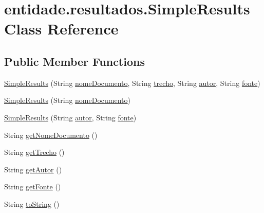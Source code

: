 \hypertarget{classentidade_1_1resultados_1_1SimpleResults}{}\section{entidade.\+resultados.\+Simple\+Results Class Reference}
\label{classentidade_1_1resultados_1_1SimpleResults}
\subsection*{Public Member Functions}
\begin{DoxyCompactItemize}
\item 
\hyperlink{classentidade_1_1resultados_1_1SimpleResults_a36411d7a5b487a8cb8d49e5dc13cccc3}{Simple\+Results} (String \hyperlink{classentidade_1_1resultados_1_1SimpleResults_a9dec340294219ec16a2e2b42e68ba350}{nome\+Documento}, String \hyperlink{classentidade_1_1resultados_1_1SimpleResults_a94e8f77e73a35a3a544f30de1d4fa5b6}{trecho}, String \hyperlink{classentidade_1_1resultados_1_1SimpleResults_afc17e94212f3953a05f63f9de5d4c345}{autor}, String \hyperlink{classentidade_1_1resultados_1_1SimpleResults_a2442d65af6ba817cd26d5bd41ef8c65c}{fonte})
\item 
\hyperlink{classentidade_1_1resultados_1_1SimpleResults_a4096968b8553b2b79984846a6f51603d}{Simple\+Results} (String \hyperlink{classentidade_1_1resultados_1_1SimpleResults_a9dec340294219ec16a2e2b42e68ba350}{nome\+Documento})
\item 
\hyperlink{classentidade_1_1resultados_1_1SimpleResults_a812be57a6cbdee87ce754241eeae9bc0}{Simple\+Results} (String \hyperlink{classentidade_1_1resultados_1_1SimpleResults_afc17e94212f3953a05f63f9de5d4c345}{autor}, String \hyperlink{classentidade_1_1resultados_1_1SimpleResults_a2442d65af6ba817cd26d5bd41ef8c65c}{fonte})
\item 
String \hyperlink{classentidade_1_1resultados_1_1SimpleResults_a42841134beb2bdeada3038d4550bf177}{get\+Nome\+Documento} ()
\item 
String \hyperlink{classentidade_1_1resultados_1_1SimpleResults_ae3d772893f928871dd13263ba4453e11}{get\+Trecho} ()
\item 
String \hyperlink{classentidade_1_1resultados_1_1SimpleResults_a9d78a2cab567ec7193d5a0defdd8629c}{get\+Autor} ()
\item 
String \hyperlink{classentidade_1_1resultados_1_1SimpleResults_af74e679c1d8154f9c4fc247edda6abed}{get\+Fonte} ()
\item 
String \hyperlink{classentidade_1_1resultados_1_1SimpleResults_aed676e978f66a5e2fc11332124c9f91f}{to\+String} ()
\end{DoxyCompactItemize}
